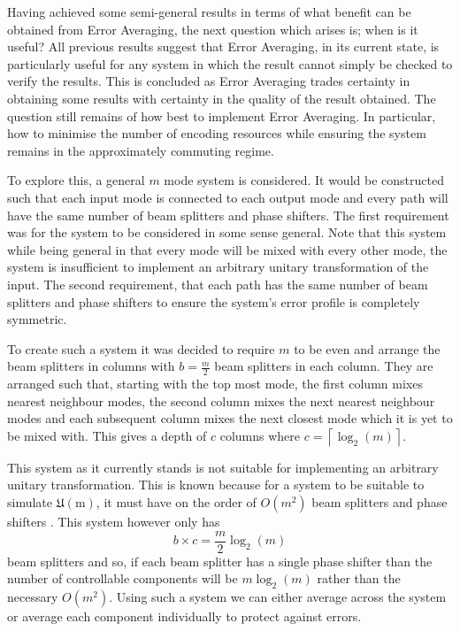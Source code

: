 \documentclass[aps,pra,twocolumn,superscriptaddress,numerical,floatfix]{revtex4-1}
\begin{document}
Having achieved some semi-general results in terms of what benefit can be obtained from Error Averaging, the next question which arises is; when is it useful? All previous results suggest that Error Averaging, in its current state, is particularly useful for any system in which the result cannot simply be checked to verify the results. This is concluded as Error Averaging trades certainty in obtaining some results with certainty in the quality of the result obtained. The question still remains of how best to implement Error Averaging. In particular, how to minimise the number of encoding resources while ensuring the system remains in the approximately commuting regime.

To explore this, a general $m$ mode system is considered. It would be constructed such that each input mode is connected to each output mode and every path will have the same number of beam splitters and phase shifters. The first requirement was for the system to be considered in some sense general. Note that this system while being general in that every mode will be mixed with every other mode, the system is insufficient to implement an arbitrary unitary transformation of the input. The second requirement, that each path has the same number of beam splitters and phase shifters to ensure the system's error profile is completely symmetric.

To create such a system it was decided to require $m$ to be even and arrange the beam splitters in columns with $b=\frac{m}{2}$ beam splitters in each column. They are arranged such that, starting with the top most mode, the first column mixes nearest neighbour modes, the second column mixes the next nearest neighbour modes and each subsequent column mixes the next closest mode which it is yet to be mixed with. This gives a depth of $c$ columns where $c=\left\lceil \log_{2}(m)\right\rceil $.

This system as it currently stands is not suitable for implementing an arbitrary unitary transformation. This is known because for a system to be suitable to simulate $\mathfrak{U\mathrm{(m)}}$, it must have on the order of $O\left(m^{2}\right)$ beam splitters and phase shifters \cite{reck}. This system however only has
\begin{equation}
b\times c=\frac{m}{2}\log_{2}(m)
\end{equation}
beam splitters and so, if each beam splitter has a single phase shifter than the number of controllable components will be $m\log_{2}(m)$ rather than the necessary $O\left(m^{2}\right)$. Using such a system we can either average across the system or average each component individually to protect against errors.
\end{document}
